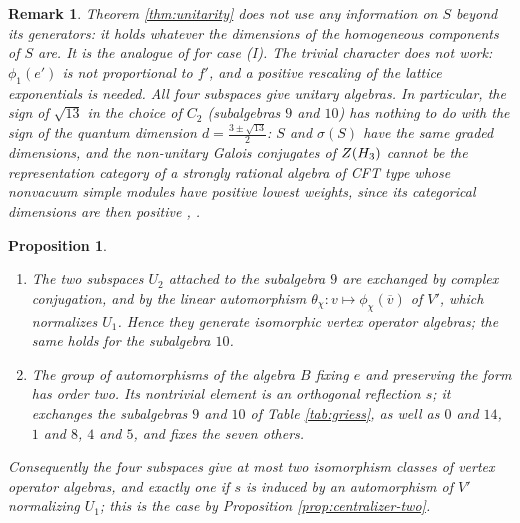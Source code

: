 \documentclass[leqno]{article}
\let\cal\relax
\newcommand{\cal}{\mathcal}
\newcommand{\co}{\colon}
\newtheorem{prop}[thm]{Proposition}
\newtheorem{remark}[thm]{Remark}
\numberwithin{equation}{section}
\begin{document}
\begin{remark}\normalfont
\label{rem:unitarity-scope}
Theorem \ref{thm:unitarity} does not use any information on $S$ beyond its generators: it holds whatever the dimensions of the homogeneous components of $S$ are. It is the analogue of \cite[Section 3]{Rie26b} for case (I). The trivial character does not work: $\phi_1(e')$ is not proportional to $f'$, and a positive rescaling of the lattice exponentials is needed. All four subspaces give unitary algebras. In particular, the sign of $\sqrt{13}$ in the choice of $C_2$ (subalgebras $9$ and $10$) has nothing to do with the sign of the quantum dimension $d = \frac{3 \pm \sqrt{13}}{2}$: $S$ and $\sigma(S)$ have the same graded dimensions, and the non-unitary Galois conjugates of $Z(\cal H_3)$ \cite{EvG17} cannot be the representation category of a strongly rational algebra of CFT type whose nonvacuum simple modules have positive lowest weights, since its categorical dimensions are then positive \cite[Lemma 4.2]{DJX13}, \cite{Hua08}.
\end{remark}

\begin{prop}
\label{prop:symmetries}
\begin{enumerate}
\item The two subspaces $U_2$ attached to the subalgebra $9$ are exchanged by complex conjugation, and by the linear automorphism $\theta_\chi \co v \mapsto \phi_\chi(\overline{v})$ of $V'$, which normalizes $U_1$. Hence they generate isomorphic vertex operator algebras; the same holds for the subalgebra $10$.
\item The group of automorphisms of the algebra $B$ fixing $e$ and preserving the form has order two. Its nontrivial element is an orthogonal reflection $s$; it exchanges the subalgebras $9$ and $10$ of Table \ref{tab:griess}, as well as $0$ and $14$, $1$ and $8$, $4$ and $5$, and fixes the seven others.
\end{enumerate}
Consequently the four subspaces give at most two isomorphism classes of vertex operator algebras, and exactly one if $s$ is induced by an automorphism of $V'$ normalizing $U_1$; this is the case by Proposition \ref{prop:centralizer-two}.
\end{prop}
\end{document}
